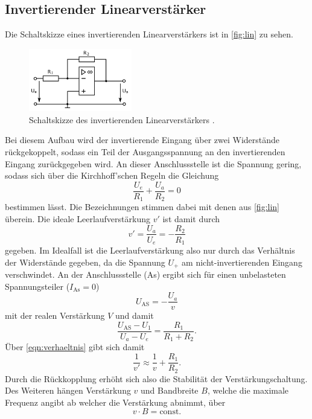 \subsection{Invertierender Linearverstärker}
Die Schaltskizze eines invertierenden Linearverstärkers ist in \autoref{fig:lin} zu sehen.
\begin{figure}[H]
    \centering
    \includegraphics[width=0.4\textwidth]{linear.png}
    \caption{Schaltskizze des invertierenden Linearverstärkers \cite{anleitung}.}
    \label{fig:lin}
\end{figure}
Bei diesem Aufbau wird der invertierende Eingang über zwei Widerstände rückgekoppelt,
sodass ein Teil der 
Ausgangsspannung an den invertierenden Eingang zurückgegeben wird. An dieser Anschlussstelle 
ist die Spannung gering, sodass sich über die Kirchhoff'schen Regeln die Gleichung 
\begin{equation*}
    \frac{U_e}{R_1} + \frac{U_a}{R_2} = 0
\end{equation*}
bestimmen lässt. Die Bezeichnungen stimmen dabei mit denen aus \autoref{fig:lin} überein.
Die ideale Leerlaufverstärkung $v'$ ist damit durch 
\begin{equation}
    \label{eqn:verhaeltnis}
    v' = \frac{U_a}{U_e} = - \frac{R_2}{R_1}
\end{equation}
gegeben. Im Idealfall ist die Leerlaufverstärkung also nur durch das Verhältnis der Widerstände
gegeben, da die Spannung $U_+$ am nicht-invertierenden Eingang verschwindet.
An der Anschlussstelle (As) ergibt sich für einen unbelasteten Spannungsteiler ($I_\text{As}=0$)
\begin{equation*}
    U_\text{AS} = - \frac{U_a}{v}
\end{equation*}
mit der realen Verstärkung $V$ und damit 
\begin{equation*}
    \frac{U_\text{AS} - U_1}{U_a - U_e} = \frac{R_1}{R_1 + R_2}.
\end{equation*}   
Über \autoref{eqn:verhaeltnis} gibt sich damit
\begin{equation*}
    \frac{1}{v'} \approx \frac{1}{v} + \frac{R_1}{R_2}.
\end{equation*}
Durch die Rückkopplung erhöht sich also die Stabilität der Verstärkungschaltung.
Des Weiteren hängen Verstärkung $v$ und Bandbreite $B$, welche die maximale Frequenz angibt 
ab welcher die Verstärkung abnimmt, über 
\begin{equation*}
    v \cdot B = \text{const.}
\end{equation*}

